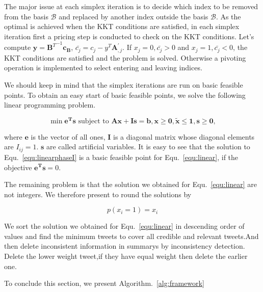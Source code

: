 \documentclass{llncs}
\begin{document}
The major issue at each simplex iteration is to decide which index to be removed from the basis $\mathcal{B}$ and replaced by another index outside the basis $\mathcal{B}$.  As the optimal is achieved when the KKT conditions are satisfied, in each simplex iteration first  a pricing step is conducted to check on the KKT conditions.  Let's compute $\mathbf{y} = {\mathbf{B}^T}^{-1}\mathbf{c_B}$, $\bar{c_j} = c_j - y^T\mathbf{A}_{,j}^{'}$. If $x_j = 0, \bar{c_j} > 0$ and $x_j = 1,\bar{c_j} < 0$,  the KKT conditions are satisfied and the problem is solved. Otherwise a pivoting operation is implemented to select entering and leaving indices.

We should keep in mind that the simplex iterations are run on basic feasible points. To obtain an easy start of basic feasible points, we solve the following linear programming problem.

\begin{equation}\label{equ:linearphaseI}
\min \mathbf{e^{T}s} \textrm{ subject to } \mathbf{Ax} + \mathbf{Is} = \mathbf{b}, \mathbf{x}\geq \mathbf{0},\tilde{\mathbf{x}} \leq \mathbf{1},\mathbf{s}\geq \mathbf{0},
\end{equation}

where $\mathbf{e}$ is the vector of all ones, $\mathbf{I}$ is a diagonal matrix whose diagonal elements are $I_{ij}=1$. $\mathbf{s}$ are called artificial variables. It is easy to see that the solution to Equ.~\ref{equ:linearphaseI} is a basic feasible point for Equ.~\ref{equ:linear}, if the objective $\mathbf{e^{T}s}=0 $.

The remaining problem is that the solution we obtained for Equ.~\ref{equ:linear} are not integers. We therefore present to round the solutions by

\begin{equation}
p(x_i=1)= x_i
\end{equation}

We sort the solution we obtained for Equ.~\ref{equ:linear} in descending order of values and find the minimum tweets to cover all credible and relevant tweets.And then delete inconsistent information in summarys by inconsistency detection. Delete the lower weight tweet,if they have equal weight then delete the earlier one.

To conclude this section, we present Algorithm.~\ref{alg:framework}
\end{document}
